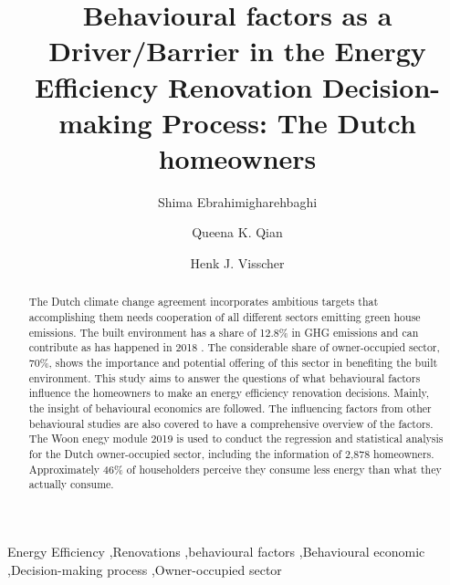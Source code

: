 \documentclass[preprint,12pt,3p]{elsarticle}
\begin{document}
\begin{frontmatter}


\title{Behavioural factors as a Driver/Barrier in the Energy Efficiency Renovation Decision-making Process: The Dutch homeowners} 



\author[label1]{Shima Ebrahimigharehbaghi}
\address[label1]{Delft University of Technology, Faculty of Architecture and the Built Environment, OTB, Julianalaan 134, 2628 BL, Delft, The Netherlands}


\author[label1]{Queena K. Qian}
\author[label1]{Henk J. Visscher}




\begin{abstract}

The Dutch climate change agreement incorporates ambitious targets that accomplishing them needs cooperation of all different sectors emitting green house emissions. The built environment has a share of 12.8\% in GHG emissions and can contribute as has happened in 2018 \citep{cbs2018}. The considerable share of owner-occupied sector, 70\%, shows the importance and potential offering of this sector in benefiting the built environment. This study aims to answer the questions of what behavioural factors influence the homeowners to make an energy efficiency renovation decisions. Mainly, the insight of behavioural economics are followed. The influencing factors from other behavioural studies are also covered to have a comprehensive overview of the factors.  The Woon enegy module 2019 is used to conduct the regression and statistical analysis for the Dutch owner-occupied sector, including the information of 2,878 homeowners. Approximately 46\% of householders perceive they consume less energy than what they actually consume. 




\end{abstract}

\begin{keyword}

Energy Efficiency \sep Renovations \sep behavioural factors  \sep Behavioural economic \sep Decision-making process \sep Owner-occupied sector

\end{keyword}

\end{frontmatter}



\pagebreak
\end{document}
